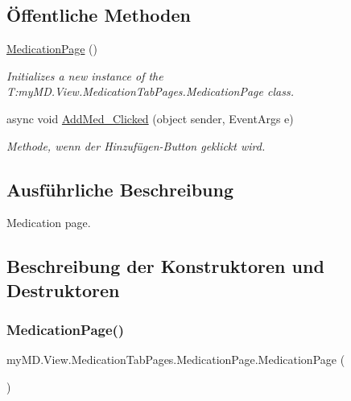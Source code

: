 \subsection*{Öffentliche Methoden}
\begin{DoxyCompactItemize}
\item 
\mbox{\hyperlink{classmy_m_d_1_1_view_1_1_medication_tab_pages_1_1_medication_page_a99467ba42e4ccde63fea9ba2dd04f7cc}{Medication\+Page}} ()
\begin{DoxyCompactList}\small\item\em Initializes a new instance of the T\+:my\+M\+D.\+View.\+Medication\+Tab\+Pages.\+Medication\+Page class. \end{DoxyCompactList}\item 
async void \mbox{\hyperlink{classmy_m_d_1_1_view_1_1_medication_tab_pages_1_1_medication_page_a8f462e0f3c47fc90db5745284f1186e8}{Add\+Med\+\_\+\+Clicked}} (object sender, Event\+Args e)
\begin{DoxyCompactList}\small\item\em Methode, wenn der Hinzufügen-\/\+Button geklickt wird. \end{DoxyCompactList}\end{DoxyCompactItemize}


\subsection{Ausführliche Beschreibung}
Medication page. 



\subsection{Beschreibung der Konstruktoren und Destruktoren}
\mbox{\label{classmy_m_d_1_1_view_1_1_medication_tab_pages_1_1_medication_page_a99467ba42e4ccde63fea9ba2dd04f7cc}} 
\subsubsection{\texorpdfstring{Medication\+Page()}{MedicationPage()}}
{\footnotesize\ttfamily my\+M\+D.\+View.\+Medication\+Tab\+Pages.\+Medication\+Page.\+Medication\+Page (\begin{DoxyParamCaption}{ }\end{DoxyParamCaption})}



